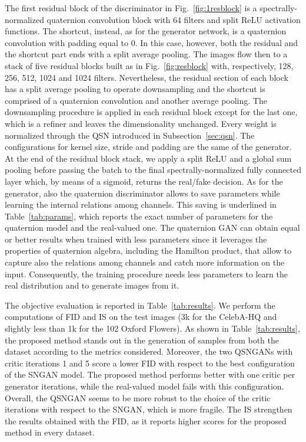 \documentclass[graybox]{svmult}
\begin{document}
The first residual block of the discriminator in Fig.~\ref{fig:1resblock} is a spectrally-normalized quaternion convolution block with 64  filters and split ReLU activation functions. The shortcut, instead, as for the generator network, is a  quaternion convolution with padding equal to 0. In this case, however, both the residual and the shortcut part ends with a  split average pooling. The images flow then to a stack of five residual blocks built as in Fig.~\ref{fig:resblock} with, respectively, 128, 256, 512, 1024 and 1024 filters. Nevertheless, the residual section of each block has a split average pooling to operate downsampling and the shortcut is comprised of a quaternion convolution and another average pooling. The downsampling procedure is applied in each residual block except for the last one, which is a refiner and leaves the dimensionality unchanged. Every weight is normalized through the QSN introduced in Subsection~\ref{sec:qsn}. The configurations for kernel size, stride and padding are the same of the generator. At the end of the residual block stack, we apply a split ReLU and a global sum pooling before passing the batch to the final spectrally-normalized fully connected layer which, by means of a sigmoid, returns the real/fake decision. As for the generator, also the quaternion discriminator allows to save parameters while learning the internal relations among channels. This saving is underlined in Table~\ref{tab:params}, which reports the exact number of parameters for the quaternion model and the real-valued one. The quaternion GAN can obtain equal or better results when trained with less parameters since it leverages the properties of quaternion algebra, including the Hamilton product, that allow to capture also the relations among channels and catch more information on the input. Consequently, the training procedure needs less parameters to learn the real distribution and to generate images from it.

The objective evaluation is reported in Table~\ref{tab:results}. We perform the computations of FID and IS on the test images (3k for the CelebA-HQ and slightly less than 1k for the 102 Oxford Flowers). As shown in Table~\ref{tab:results}, the proposed method stands out in the generation of samples from both the dataset according to the metrics considered. Moreover, the two QSNGANs with critic iterations 1 and 5 score a lower FID with respect to the best configuration of the SNGAN model. The proposed method performs better with one critic per generator iterations, while the real-valued model fails with this configuration. Overall, the QSNGAN seems to be more robust to the choice of the critic iterations with respect to the SNGAN, which is more fragile. The IS strengthen the results obtained with the FID, as it reports higher scores for the proposed method in every dataset.
\end{document}
